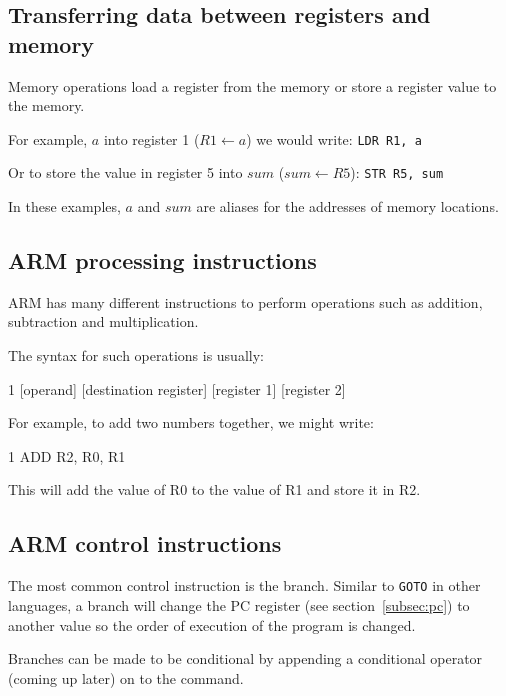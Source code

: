 \documentclass{article}
\begin{document}
\subsection{Transferring data between registers and memory}

Memory operations load a register from the memory or store a register value to the memory.

For example, $a$ into register 1 ($R1 \leftarrow a$) we would write:
{\tt LDR R1, a}

Or to store the value in register 5 into $sum$ ($sum \leftarrow R5$):
{\tt STR R5, sum}

In these examples, $a$ and $sum$ are aliases for the addresses of memory locations.

\subsection{ARM processing instructions}

ARM has many different instructions to perform operations such as addition, subtraction and multiplication.

The syntax for such operations is usually:

\begin{listing}{1}
	[operand]	[destination register]	[register 1]	[register 2]
\end{listing}

For example, to add two numbers together, we might write:

\begin{listing}{1}
	ADD	R2, R0, R1
\end{listing}

This will add the value of R0 to the value of R1 and store it in R2.

\subsection{ARM control instructions}

The most common control instruction is the branch. Similar to \texttt{GOTO} in other languages, a branch will change the PC register (see section~\ref{subsec:pc}) to another value so the order of execution of the program is changed.


Branches can be made to be conditional by appending a conditional operator (coming up later) on to the command.
\end{document}
